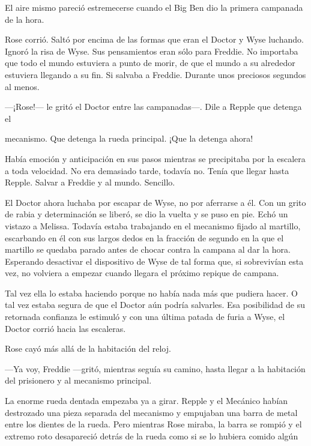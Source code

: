 {El aire mismo pareció estremecerse cuando el Big Ben dio la primera
campanada de la hora.}

{Rose corrió. Saltó por encima de las formas que eran el Doctor y Wyse
	luchando. Ignoró la risa de Wyse. Sus pensamientos eran sólo para
	Freddie. No importaba que todo el mundo estuviera a punto de morir, de
	que el mundo a su alrededor estuviera llegando a su fin. Si salvaba a
Freddie. Durante unos preciosos segundos al menos.}

{---¡Rose!--- le gritó el Doctor entre las campanadas---. Dile a Repple
que detenga el}

{mecanismo. Que detenga la rueda principal. ¡Que la detenga ahora!}

{}

{Había emoción y anticipación en sus pasos mientras se precipitaba por
	la escalera a toda velocidad. No era demasiado tarde, todavía no. Tenía
que llegar hasta Repple. Salvar a Freddie y al mundo. Sencillo.}

{El Doctor ahora luchaba por escapar de Wyse, no por aferrarse a él. Con
	un grito de rabia y determinación se liberó, se dio la vuelta y se puso
	en pie. Echó un vistazo a Melissa. Todavía estaba trabajando en el
	mecanismo fijado al martillo, escarbando en él con sus largos dedos en
	la fracción de segundo en la que el martillo se quedaba parado antes de
	chocar contra la campana al dar la hora. Esperando desactivar el
	dispositivo de Wyse de tal forma que, si sobrevivían esta vez, no
volviera a empezar cuando llegara el próximo repique de campana.}

{Tal vez ella lo estaba haciendo porque no había nada más que pudiera
	hacer. O tal vez estaba segura de que el Doctor aún podría salvarles.
	Esa posibilidad de su retornada confianza le estimuló y con una última
patada de furia a Wyse, el Doctor corrió hacia las escaleras.}

\mbox{}

{Rose cayó más allá de la habitación del reloj.}

{---Ya voy, Freddie ---gritó, mientras seguía su camino, hasta llegar a
la habitación del prisionero y al mecanismo principal.}

{La enorme rueda dentada empezaba ya a girar. Repple y el Mecánico
	habían destrozado una pieza separada del mecanismo y empujaban una barra
	de metal entre los dientes de la rueda. Pero mientras Rose miraba, la
	barra se rompió y el extremo roto desapareció detrás de la rueda como si
se lo hubiera comido algún}

